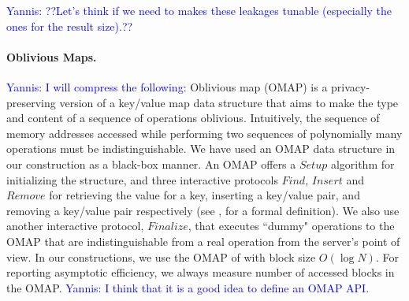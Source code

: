 \documentclass[sigconf]{acmart}
\newcommand{\yannis}[1]{\textcolor{blue}{Yannis: #1}}
\begin{document}
\yannis{??Let's think if we need to makes these leakages tunable (especially the ones for the result size).??}

\paragraph{\textbf{Oblivious Maps.}}\yannis{I will compress the following:}
 Oblivious map (OMAP) is a privacy-preserving version of a key/value map data structure that aims to make the type and content of a sequence of operations oblivious.
 Intuitively, the sequence of memory addresses accessed while performing two sequences of polynomially many operations must be indistinguishable.
 We have used an OMAP data structure in our construction as a black-box manner. An OMAP offers a $Setup$ algorithm for initializing the structure, and three interactive protocols $Find$, $Insert$ and $Remove$ for retrieving the value for a key, inserting a key/value
pair, and removing a key/value pair respectively (see \cite{ShiCCS13}, \cite{ODel} for a formal definition). We also use another interactive protocol, $Finalize$, that executes “dummy" operations to the OMAP that are indistinguishable from a real operation from the server’s point of view. In our constructions, we use the OMAP of \cite{ShiCCS13} with block size $O(\log N)$. For reporting asymptotic efficiency, we always measure number of accessed blocks in the OMAP.
\yannis{I think that it is a good idea to define an OMAP API.}
\end{document}
